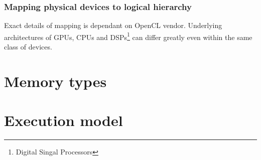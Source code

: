 \subsubsection{Mapping physical devices to logical hierarchy}

Exact details of mapping is dependant on OpenCL vendor. Underlying architectures
of GPUs, CPUs and DSPs\footnote{Digital Singal Processors} can differ greatly
even within the same class of devices.

\section{Memory types}

\section{Execution model}
